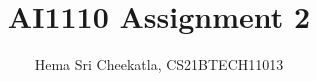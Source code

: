 \documentclass[journal,12pt,twocolumn]{IEEEtran}
\begin{document}
\makeatletter
{}
\makeatother
\let\StandardTheFigure\thefigure
\let\vec\mathbf
\renewcommand{\thefigure}{\theproblem}
\def\putbox#1#2#3{\makebox[0in][l]{\makebox[#1][l]{}\raisebox{\baselineskip}[0in][0in]{\raisebox{#2}[0in][0in]{#3}}}}
     \def\rightbox#1{\makebox[0in][r]{#1}}
     \def\centbox#1{\makebox[0in]{#1}}
     \def\topbox#1{\raisebox{-\baselineskip}[0in][0in]{#1}}
     \def\midbox#1{\raisebox{-0.5\baselineskip}[0in][0in]{#1}}
\vspace{3cm}
\title{AI1110 Assignment 2}
\author{ Hema Sri Cheekatla, CS21BTECH11013}	
\maketitle
\end{document}
